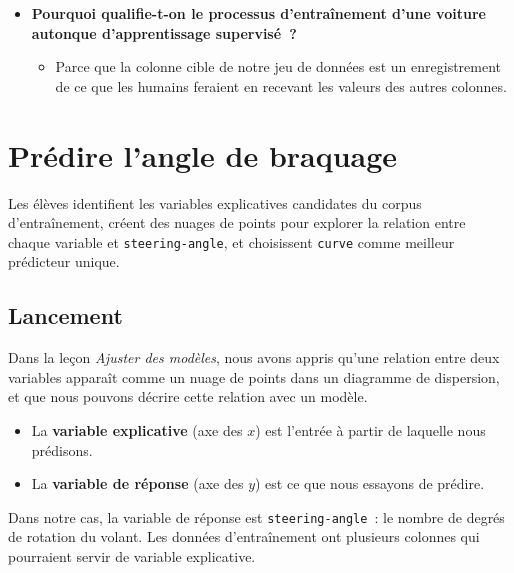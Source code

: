 \documentclass[12pt,a4paper]{article}
\begin{document}
\begin{thinkbox}
  \begin{itemize}
    \item \textbf{Pourquoi qualifie-t-on le processus d'entraînement d'une voiture autonque d'apprentissage supervisé~?}
    \begin{itemize}
      \item Parce que la colonne cible de notre jeu de données est un enregistrement de ce que les humains feraient en recevant les valeurs des autres colonnes.
    \end{itemize}
  \end{itemize}
\end{thinkbox}

\newpage

\section{Prédire l'angle de braquage}

\begin{overviewbox}
  Les élèves identifient les variables explicatives candidates du corpus d'entraînement, créent des nuages de points pour explorer la relation entre chaque variable et \texttt{steering-angle}, et choisissent \texttt{curve} comme meilleur prédicteur unique.
\end{overviewbox}

\subsection{Lancement}

Dans la leçon \emph{Ajuster des modèles}, nous avons appris qu'une relation entre deux variables apparaît comme un nuage de points dans un diagramme de dispersion, et que nous pouvons décrire cette relation avec un modèle.

\begin{keypointbox}
  \begin{itemize}
    \item La \textbf{variable explicative} (axe des $x$) est l'entrée à partir de laquelle nous prédisons.
    \item La \textbf{variable de réponse} (axe des $y$) est ce que nous essayons de prédire.
  \end{itemize}

  Dans notre cas, la variable de réponse est \texttt{steering-angle}~: le nombre de degrés de rotation du volant. Les données d'entraînement ont plusieurs colonnes qui pourraient servir de variable explicative.
\end{keypointbox}
\end{document}
